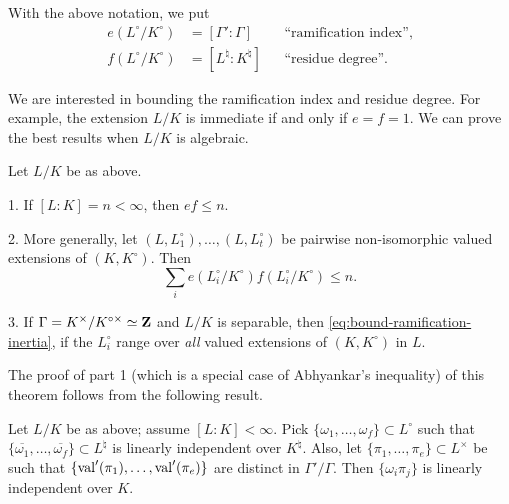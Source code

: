 \begin{definition}
With the above notation, we put 
\begin{align*}
  e(L^\circ/K^\circ) &= [\Gamma'\colon \Gamma] && \text{``ramification index''} , \\
  f(L^\circ/K^\circ) &= [L^\natural\colon K^\natural] && \text{``residue degree''} .
\end{align*}
\end{definition}

We are interested in bounding the ramification index and residue degree. 
For example, the extension $L/K$ is immediate if and only if $e=f=1$. We can 
prove the best results when $L/K$ is algebraic. 

\begin{theorem}
Let $L/K$ be as above. 

1. If $[L\colon K]=n<\infty$, then $e f\leqslant n$. 

2. More generally, let $(L,L_1^\circ),\dots,(L,L_t^\circ)$ be pairwise 
non-isomorphic valued extensions of $(K,K^\circ)$. Then 
\begin{equation}\label{eq:bound-ramification-inertia}
  \sum_i e(L_i^\circ/K^\circ) f(L_i^\circ/K^\circ) \leqslant n .
\end{equation}

3. If $\Gamma=K^\times/K^{\circ\times}\simeq \mathbf{Z}$ and $L/K$ is separable, then 
\eqref{eq:bound-ramification-inertia}, if the $L_i^\circ$ range over 
\emph{all} valued extensions of $(K,K^\circ)$ in $L$. 
\end{theorem}

The proof of part 1 (which is a special case of Abhyankar's inequality) of 
this theorem follows from the following result. 

\begin{lemma}
Let $L/K$ be as above; assume $[L\colon K]<\infty$. Pick 
$\{\omega_1,\dots,\omega_f\}\subset L^\circ$ such that 
$\{\overline{\omega_1},\dots,\overline{\omega_f}\}\subset L^\natural$ is 
linearly independent over $K^\natural$. Also, let 
$\{\pi_1,\dots,\pi_e\}\subset L^\times$ be such that 
$\{\operatorname{val}'(\pi_1),\dots,\operatorname{val}'(\pi_e)\}$ are distinct in 
$\Gamma'/\Gamma$. Then $\{\omega_i \pi_j\}$ is linearly independent over $K$. 
\end{lemma}

